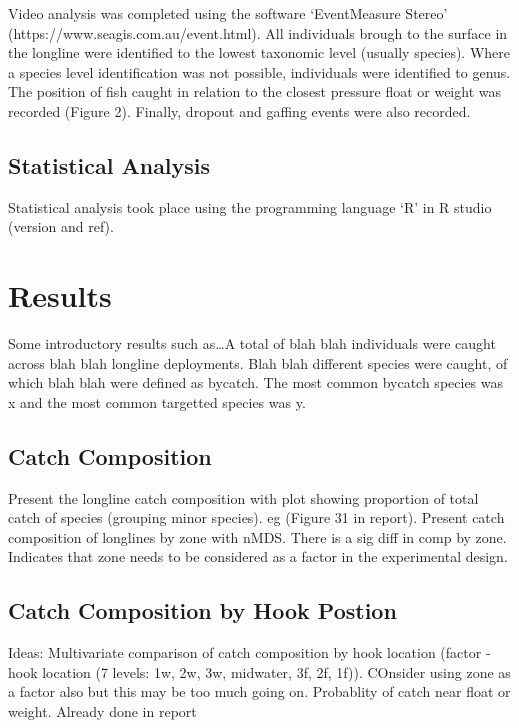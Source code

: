 \documentclass[preprint, 3p,
authoryear]{elsarticle} %
\begin{document}
Video analysis was completed using the software `EventMeasure Stereo'
(https://www.seagis.com.au/event.html). All individuals brough to the
surface in the longline were identified to the lowest taxonomic level
(usually species). Where a species level identification was not
possible, individuals were identified to genus. The position of fish
caught in relation to the closest pressure float or weight was recorded
(Figure 2). Finally, dropout and gaffing events were also recorded.

\hypertarget{statistical-analysis}{%
\subsection{Statistical Analysis}\label{statistical-analysis}}

Statistical analysis took place using the programming language `R' in R
studio (version and ref).

\hypertarget{results}{%
\section{Results}\label{results}}

Some introductory results such as\ldots A total of blah blah individuals
were caught across blah blah longline deployments. Blah blah different
species were caught, of which blah blah were defined as bycatch. The
most common bycatch species was x and the most common targetted species
was y.

\hypertarget{catch-composition}{%
\subsection{Catch Composition}\label{catch-composition}}

Present the longline catch composition with plot showing proportion of
total catch of species (grouping minor species). eg (Figure 31 in
report). Present catch composition of longlines by zone with nMDS. There
is a sig diff in comp by zone. Indicates that zone needs to be
considered as a factor in the experimental design.

\hypertarget{catch-composition-by-hook-postion}{%
\subsection{Catch Composition by Hook
Postion}\label{catch-composition-by-hook-postion}}

Ideas: Multivariate comparison of catch composition by hook location
(factor - hook location (7 levels: 1w, 2w, 3w, midwater, 3f, 2f, 1f)).
COnsider using zone as a factor also but this may be too much going on.
Probablity of catch near float or weight. Already done in report
\end{document}
